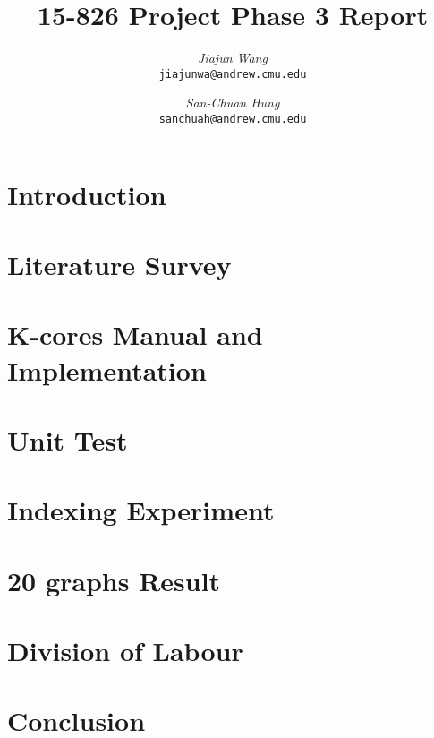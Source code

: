 \documentclass[12pt]{article}
\begin{document}
\renewcommand{\algorithmicrequire}{\textbf{Input:}}  %
\renewcommand{\algorithmicensure}{\textbf{Output:}} %
 
\newcommand{\beq}{\begin{equation}}
\newcommand{\eeq}{\end{equation}}
\newcommand{\bit}{\begin{itemize*}}
\newcommand{\eit}{\end{itemize*}}
\newcommand{\goal}[1]{ {\noindent {$\Rightarrow$} \em {#1} } }
\newcommand{\hide}[1]{}
\newcommand{\comment}[1]{ {\footnotesize {#1} } }
\newtheorem{lemma}{Lemma}
\newtheorem{theorem}{Theorem}
\newtheorem{proof}{Proof}
\newtheorem{defn}{Definition}
\newtheorem{algo}{Algorithm}
\newtheorem{observation}{Observation}

\title{15-826 Project Phase 3 Report}

\author{ {\em Jiajun Wang} \\
	    {\tt jiajunwa@andrew.cmu.edu}
	 \and
	 {\em San-Chuan Hung} \\
	     {\tt sanchuah@andrew.cmu.edu}
}

\maketitle

\section{Introduction}
	

\section{Literature Survey}
    \label{sec:survey}
    

\section{K-cores Manual and Implementation}
    \label{sec:kcor}
    

\section{Unit Test}
    \label{sec:unittest}
    

\section{Indexing Experiment}
	\label{sec:indexing}
	
	
\section{20 graphs Result}
	\label{sec:experiment}
    
	
\section{Division of Labour}
	\label{sec:dl}
    
	
\section{Conclusion}
	



\end{document}
